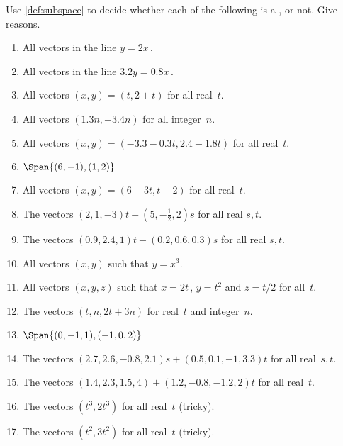\begin{exercise} \label{ex:} 
Use \autoref{def:subspace} to decide whether each of the following is a , or not.  Give reasons.
\begin{enumerate}
\item All vectors in the line \(y=2x\)\,.

\item All vectors in the line \(3.2y=0.8x\)\,.

\item All vectors \((x,y)=(t,2+t)\) for all real~\(t\).

\item All vectors \((1.3n,-3.4n)\) for all integer~\(n\).

\item All vectors \((x,y)=(-3.3-0.3t,2.4-1.8t)\) for all real~\(t\).%

\item \(\Span\{(6,-1),(1,2)\}\)

\item All vectors \((x,y)=(6-3t,t-2)\) for all real~\(t\).

\item The vectors \((2,1,-3)t+(5,-\frac12,2)s\) for all real \(s,t\).

\item The vectors \((0.9,2.4,1)t-(0.2,0.6,0.3)s\) for all real \(s,t\).

\item All vectors \((x,y)\) such that \(y=x^3\).

\item All vectors \((x,y,z)\) such that \(x=2t\)\,, \(y=t^2\) and \(z=t/2\) for all~\(t\).

\item The vectors \((t,n,2t+3n)\) for real~\(t\) and integer~\(n\).

\item \(\Span\{(0,-1,1),(-1,0,2)\}\)

\item The vectors \((2.7,2.6,-0.8,2.1)s+(0.5,0.1,-1,3.3)t\) for all real~\(s,t\).

\item The vectors \((1.4,2.3,1.5,4)+(1.2,-0.8,-1.2,2)t\) for all real~\(t\).

\item The vectors \((t^3,2t^3)\) for all real~\(t\) (tricky).

\item The vectors \((t^2,3t^2)\) for all real~\(t\) (tricky).

\end{enumerate}
\end{exercise}





